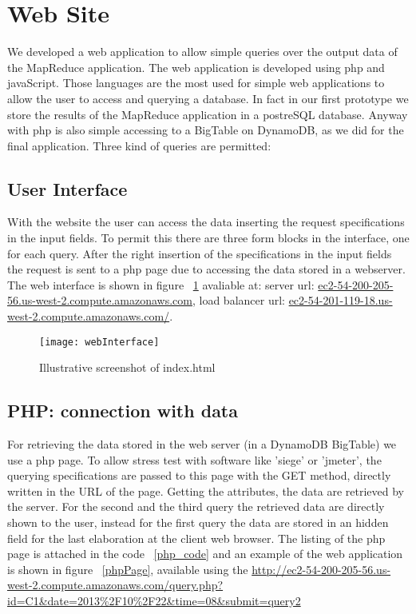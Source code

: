 \documentclass{article}
\begin{document}
\section{Web Site}
We developed a web application to allow simple queries over the output data of the MapReduce application.
The web application is developed using php and javaScript. 
Those languages are the most used for simple web applications to allow the user to access and querying a 
database. In fact in our first prototype we store the results of the MapReduce application in a postreSQL database.
Anyway with php is also simple accessing to a BigTable on DynamoDB, as we did for the final application.
Three kind of queries are permitted: 

\subsection{User Interface}
With the website the user can access the data inserting the request specifications in the input fields.
To permit this there are three form blocks in the interface, one for each query. 
After the right insertion of the specifications in the input fields the request is sent to a php page due to 
accessing the data stored in a webserver.
The web interface is shown in figure ~\ref{webInterface} avaliable at: server url: \url{ec2-54-200-205-56.us-west-2.compute.amazonaws.com}, 
load balancer url: \url{ec2-54-201-119-18.us-west-2.compute.amazonaws.com/}.

\begin{figure}[H]
      \centering
      \texttt{[image: webInterface]}
      \caption{Illustrative screenshot of index.html}
      \label{webInterface}
\end{figure}

\subsection{PHP: connection with data}
For retrieving the data stored in the web server (in a DynamoDB BigTable) we use a php page.
To allow stress test with software like 'siege' or 'jmeter', the querying specifications are passed to this
page with the GET method, directly written in the URL of the page.
Getting the attributes, the data are retrieved by the server. 
For the second and the third query the retrieved data are directly shown to the user, instead for the first 
query the data are stored in an hidden field for the last elaboration at the client web browser.
The listing of the php page is attached in the code ~\ref{php_code} and an example of the web application is
shown in figure ~\ref{phpPage}, available using the \url{http://ec2-54-200-205-56.us-west-2.compute.amazonaws.com/query.php?id=C1&date=2013%2F10%2F22&time=08&submit=query2}
\end{document}
